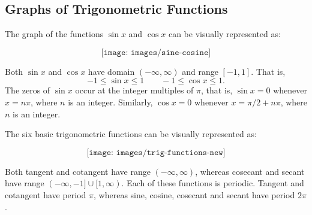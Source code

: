 \subsection{Graphs of Trigonometric Functions}
The graph of the functions $\sin x$ and $\cos x$ can be visually represented as:

$$\texttt{[image: images/sine-cosine]}$$

Both $\sin x$ and $\cos x$ have domain $(-\infty,\infty)$ and range $[-1,1]$.
That is,
$$-1\leq\sin x\leq 1\qquad -1\leq\cos x\leq 1.$$
The zeros of $\sin x$ occur at the integer multiples of $\pi$, that is, $\sin x=0$ whenever $x=n\pi$, where $n$ is an integer.
Similarly, $\cos x=0$ whenever $x=\pi/2+n\pi$, where $n$ is an integer.

The six basic trigonometric functions can be visually represented as:

$$\texttt{[image: images/trig-functions-new]}$$

Both tangent and cotangent have range $(-\infty,\infty)$, whereas cosecant and secant have range $(-\infty,-1]\cup[1,\infty)$.
Each of these functions is periodic. Tangent and cotangent have period $\pi$, whereas sine, cosine, cosecant and secant have period $2\pi$.